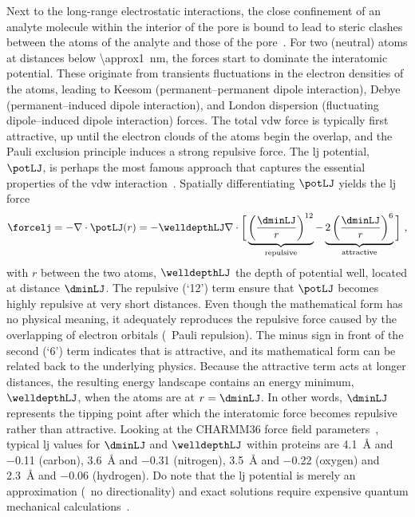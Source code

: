 Next to the long-range electrostatic interactions, the close confinement of an analyte molecule within the
interior of the pore is bound to lead to steric clashes between the atoms of the analyte and those of the
pore~\cite{Buchsbaum-2013}. For two (neutral) atoms at distances below \SI{\approx1}{\nm}, the 
forces start to dominate the interatomic potential. These originate from transients fluctuations in the
electron densities of the atoms, leading to Keesom (permanent--permanent dipole interaction), Debye
(permanent--induced dipole interaction), and London dispersion (fluctuating dipole--induced dipole
interaction) forces. The total \gls{vdw} force is typically first attractive, up until the electron clouds of
the atoms begin the overlap, and the Pauli exclusion principle induces a strong repulsive force. The \gls{lj}
potential, $\potLJ$, is perhaps the most famous approach that captures the essential properties of the
\gls{vdw} interaction~\cite{Paquet-2015}. Spatially differentiating $\potLJ$ yields the \gls{lj} force 
%
\begin{equation}\label{eq:nanopores_LJ_force}
  \forcelj = - \nabla \cdot \potLJ( r ) = - \welldepthLJ \nabla \cdot \bigg[ 
    \underbrace{ \left( \dfrac{ \dminLJ }{ r } \right)^{12} }_{\text{repulsive}}
    -
    \underbrace{ 2 \left( \dfrac{ \dminLJ }{ r } \right)^{6} }_{\text{attractive}}
  \bigg]
  \text{ ,}
\end{equation}
% 
with $r$ between the two atoms, $\welldepthLJ$ the depth of potential well, located at distance $\dminLJ$. The
repulsive (`12') term ensure that $\potLJ$ becomes highly repulsive at very short distances. Even though the
mathematical form has no physical meaning, it adequately reproduces the repulsive force caused by the
overlapping of electron orbitals (\ie~Pauli repulsion). The minus sign in front of the second (`6') term
indicates that is attractive, and its mathematical form can be related back to the underlying physics. Because
the attractive term acts at longer distances, the resulting energy landscape contains an energy minimum,
$\welldepthLJ$, when the atoms are at $r = \dminLJ$. In other words, $\dminLJ$ represents the tipping point
after which the interatomic force becomes repulsive rather than attractive. Looking at the {CHARMM36} force
field parameters~\cite{Huang-2016}, typical \gls{lj} values for $\dminLJ$ and $\welldepthLJ$ within proteins
are \SI{4.1}{\angstrom} and \SI{-0.11}{\kbt} (carbon), \SI{3.6}{\angstrom} and \SI{-0.31}{\kbt} (nitrogen),
\SI{3.5}{\angstrom} and \SI{-0.22}{\kbt} (oxygen) and \SI{2.3}{\angstrom} and \SI{-0.06}{\kbt} (hydrogen). Do
note that the \gls{lj} potential is merely an approximation (\eg~no directionality) and exact solutions
require expensive quantum mechanical calculations~\cite{Paquet-2015}.

